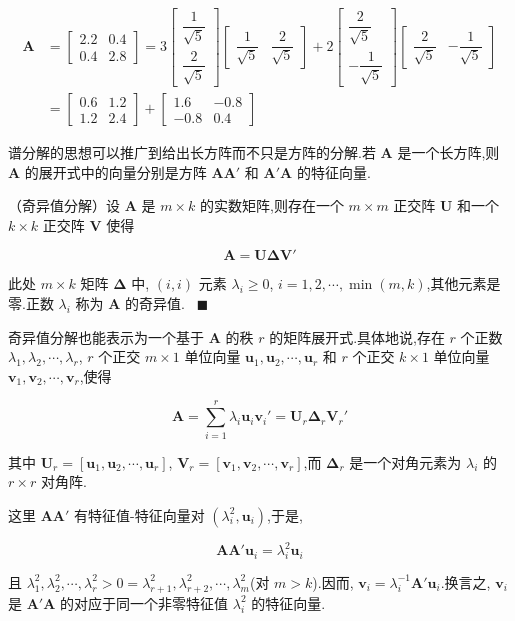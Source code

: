 \begin{equation*}
\begin{aligned}
\bm{A} &= \begin{bmatrix} 2.2 & 0.4 \\ 0.4 & 2.8 \end{bmatrix} = 3\begin{bmatrix} \dfrac{1}{\sqrt{5}} \\[2mm] \dfrac{2}{\sqrt{5}} \end{bmatrix}\begin{bmatrix} \dfrac{1}{\sqrt{5}} & \dfrac{2}{\sqrt{5}} \end{bmatrix} + 2\begin{bmatrix} \dfrac{2}{\sqrt{5}} \\[2mm] -\dfrac{1}{\sqrt{5}} \end{bmatrix}\begin{bmatrix} \dfrac{2}{\sqrt{5}} & -\dfrac{1}{\sqrt{5}} \end{bmatrix} \\
&= \begin{bmatrix} 0.6 & 1.2 \\ 1.2 & 2.4 \end{bmatrix} + \begin{bmatrix} 1.6 & -0.8 \\ -0.8 & 0.4 \end{bmatrix}
\end{aligned}
\end{equation*}

谱分解的思想可以推广到给出长方阵而不只是方阵的分解.若 $\bm{A}$ 是一个长方阵,则 $\bm{A}$ 的展开式中的向量分别是方阵 $\bm{A}\bm{A}'$ 和 $\bm{A}'\bm{A}$ 的特征向量.

\quad （奇异值分解）设 $\bm{A}$ 是 $m \times k$ 的实数矩阵,则存在一个 $m \times m$ 正交阵 $\bm{U}$ 和一个 $k \times k$ 正交阵 $\bm{V}$ 使得

\[
\bm{A} = \bm{U}\bm{\Delta}\bm{V}'
\]

此处 $m \times k$ 矩阵 $\bm{\Delta}$ 中, $(i,i)$ 元素 $\lambda_i \geqslant 0$, $i = 1, 2, \cdots, \min(m,k)$,其他元素是零.正数 $\lambda_i$ 称为 $\bm{A}$ 的奇异值. \ $\blacksquare$

奇异值分解也能表示为一个基于 $\bm{A}$ 的秩 $r$ 的矩阵展开式.具体地说,存在 $r$ 个正数 $\lambda_1, \lambda_2, \cdots, \lambda_r$, $r$ 个正交 $m \times 1$ 单位向量 $\bm{u}_1, \bm{u}_2, \cdots, \bm{u}_r$ 和 $r$ 个正交 $k \times 1$ 单位向量 $\bm{v}_1, \bm{v}_2, \cdots, \bm{v}_r$,使得

\[
\bm{A} = \sum_{i=1}^{r}\lambda_i\bm{u}_i\bm{v}_i' = \bm{U}_r\bm{\Delta}_r\bm{V}_r'
\]

其中 $\bm{U}_r = [\bm{u}_1, \bm{u}_2, \cdots, \bm{u}_r]$, $\bm{V}_r = [\bm{v}_1, \bm{v}_2, \cdots, \bm{v}_r]$,而 $\bm{\Delta}_r$ 是一个对角元素为 $\lambda_i$ 的 $r \times r$ 对角阵.

这里 $\bm{A}\bm{A}'$ 有特征值-特征向量对 $(\lambda_i^2, \bm{u}_i)$,于是,

\[
\bm{A}\bm{A}'\bm{u}_i = \lambda_i^2\bm{u}_i
\]

且 $\lambda_1^2, \lambda_2^2, \cdots, \lambda_r^2 > 0 = \lambda_{r+1}^2, \lambda_{r+2}^2, \cdots, \lambda_m^2$(对 $m > k$).因而, $\bm{v}_i = \lambda_i^{-1}\bm{A}'\bm{u}_i$.换言之, $\bm{v}_i$ 是 $\bm{A}'\bm{A}$ 的对应于同一个非零特征值 $\lambda_i^2$ 的特征向量.

